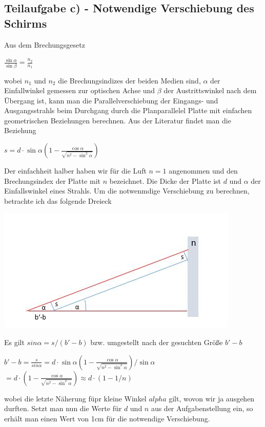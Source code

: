 \documentclass{article}
\begin{document}
\subsection*{Teilaufgabe c) - Notwendige Verschiebung des Schirms}
Aus dem Brechungsgesetz 
\begin{center}
	$\frac{\sin\alpha}{\sin\beta}=\frac{n_2}{n_1}$
\end{center}
wobei $n_1$ und $n_2$ die Brechungsindizes der beiden Medien sind, $\alpha$ der Einfallwinkel gemessen zur 
optischen Achse und $\beta$ der Austrittswinkel nach dem Übergang ist, 
kann man die Parallelverschiebung der Eingangs- und Ausgangsstrahls beim Durchgang durch die Planparallelel Platte mit einfachen geometrischen Beziehungen berechnen. 
Aus der Literatur findet man die Beziehung
\begin{center}
	$s=d\cdot \sin\alpha \left( 1-\frac{\cos\alpha}{\sqrt{n^2-\sin^2\alpha}}\right)$
\end{center}
Der einfachheit halber haben wir für die Luft $n=1$ angenommen und den Brechungsindex der 
Platte mit $n$ bezeichnet. Die Dicke der Platte ist $d$ und $\alpha$ der Einfallswinkel eines Strahls. 
Um die notwenmdige Verschiebung zu berechnen, 
betrachte ich das folgende Dreieck
\begin{center}
	\includegraphics[scale=0.6]{Linse2.JPG}
\end{center}
Es gilt $sin\alpha=s/(b'-b)$ bzw. umgestellt nach der gesuchten Größe $b'-b$
\begin{center}
	$b'-b = \frac{s}{sin\alpha} = d\cdot \sin\alpha \left( 1-\frac{\cos\alpha}{\sqrt{n^2-\sin^2\alpha}}\right) / \sin\alpha $ \\
	$= d \cdot  \left( 1-\frac{\cos\alpha}{\sqrt{n^2-\sin^2\alpha}}\right) \approx d\cdot (1-1/n)$
\end{center}
wobei die letzte Näherung füpr kleine Winkel $alpha$ gilt, wovon wir ja ausgehen durften.
Setzt man nun die Werte für $d$ und $n$ aus der Aufgabenstellung ein, so erhält man einen Wert von 1cm für die notwendige Verschiebung. 
\end{document}
